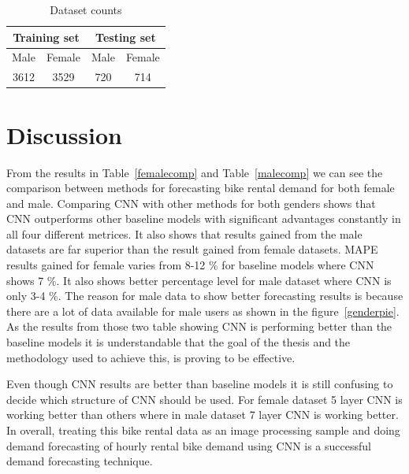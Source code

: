 
\begin{table}[]
\centering
\caption{Dataset counts}
\label{dataset}
\begin{tabular}{||c|l||c|l||}
\hline
\multicolumn{2}{||c||}{Training set}                     & \multicolumn{2}{c||}{Testing set} \\ \hline \hline
\multicolumn{1}{||l|}{Male} & Female                    & Male  & Female                   \\ \hline
3612                       & \multicolumn{1}{c||}{3529} & 720   & \multicolumn{1}{c||}{714} \\ \hline
\end{tabular}
\end{table}




\section {Discussion}
\label {Discussion}

From the results in Table~\ref{femalecomp} and Table~\ref{malecomp} we can see the comparison between methods for forecasting bike rental demand for both female and male. Comparing CNN with other methods for both genders shows that CNN outperforms other baseline models with significant advantages constantly in all four different metrices. It also shows that results gained from the male datasets are far superior than the result gained from female datasets. MAPE results gained for female varies from 8-12 \% for baseline models where CNN shows 7 \%. It also shows better percentage level for male dataset where CNN is only 3-4 \%. The reason for male data to show better forecasting results is because there are a lot of data available for male users as shown in the figure~\ref{genderpie}. As the results from those two table showing CNN is performing better than the baseline models it is understandable that the goal of the thesis and the methodology used to achieve this, is proving to be effective. 

Even though CNN results are better than baseline models it is still confusing to decide which structure of CNN should be used. For female dataset 5 layer CNN is working better than others where in male dataset 7 layer CNN is working better. In overall, treating this bike rental data as an image processing sample and doing demand forecasting of hourly rental bike demand using CNN is a successful demand forecasting technique. 

